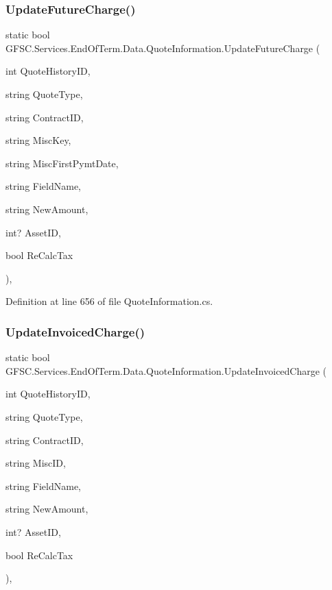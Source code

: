 \subsubsection{\texorpdfstring{Update\+Future\+Charge()}{UpdateFutureCharge()}}
{\footnotesize\ttfamily static bool G\+F\+S\+C.\+Services.\+End\+Of\+Term.\+Data.\+Quote\+Information.\+Update\+Future\+Charge (\begin{DoxyParamCaption}\item[{int}]{Quote\+History\+ID,  }\item[{string}]{Quote\+Type,  }\item[{string}]{Contract\+ID,  }\item[{string}]{Misc\+Key,  }\item[{string}]{Misc\+First\+Pymt\+Date,  }\item[{string}]{Field\+Name,  }\item[{string}]{New\+Amount,  }\item[{int?}]{Asset\+ID,  }\item[{bool}]{Re\+Calc\+Tax }\end{DoxyParamCaption})\hspace{0.3cm}{\ttfamily [static]}, {\ttfamily [package]}}



Definition at line 656 of file Quote\+Information.\+cs.

\mbox{\label{class_g_f_s_c_1_1_services_1_1_end_of_term_1_1_data_1_1_quote_information_a9412b7298900ccc6703fc64cc20d4af7}} 
\subsubsection{\texorpdfstring{Update\+Invoiced\+Charge()}{UpdateInvoicedCharge()}}
{\footnotesize\ttfamily static bool G\+F\+S\+C.\+Services.\+End\+Of\+Term.\+Data.\+Quote\+Information.\+Update\+Invoiced\+Charge (\begin{DoxyParamCaption}\item[{int}]{Quote\+History\+ID,  }\item[{string}]{Quote\+Type,  }\item[{string}]{Contract\+ID,  }\item[{string}]{Misc\+ID,  }\item[{string}]{Field\+Name,  }\item[{string}]{New\+Amount,  }\item[{int?}]{Asset\+ID,  }\item[{bool}]{Re\+Calc\+Tax }\end{DoxyParamCaption})\hspace{0.3cm}{\ttfamily [static]}, {\ttfamily [package]}}



